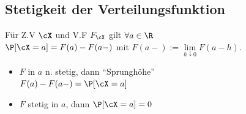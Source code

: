 \subsection{Stetigkeit der Verteilungsfunktion}
\shorttheorem[W. Punkt] Für Z.V $\cX$ und V.F $F_\cX$ gilt $\forall a \in \R$\\
$\P[\cX = a] = F(a) - F(a-)$ mit $F(a-) := \underset{h\downarrow 0}{\lim} F(a - h)$.

\begin{itemize}[label=$\bm{\rightarrow}$]
    \item $F$ in $a$ n. stetig, dann ``Sprunghöhe''\\ $F(a) - F(a-) = \P[\cX = a]$
    \item $F$ stetig in $a$, dann $\P[\cX = a] = 0$
\end{itemize}
